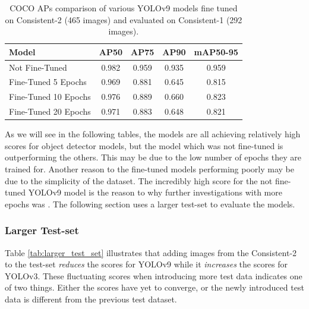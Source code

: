 \begin{table}[H]
    \centering
    \renewcommand{\arraystretch}{1.5} %
    \setlength{\tabcolsep}{1em}
    \begin{tabular}{|l|c|c|c|c|}
        \hline
        \rowcolor{gray!25}
        \textbf{Model} & \textbf{AP50} & \textbf{AP75} & \textbf{AP90} & \textbf{mAP50-95} \\ \hline
        Not Fine-Tuned       & 0.982 & 0.959 & 0.935 & 0.959 \\ \hline 
        Fine-Tuned 5 Epochs  & 0.969 & 0.881 & 0.645 & 0.815 \\ \hline
        Fine-Tuned 10 Epochs & 0.976 & 0.889 & 0.660 & 0.823 \\ \hline
        Fine-Tuned 20 Epochs & 0.971 & 0.883 & 0.648 & 0.821 \\ \hline
    \end{tabular}
    \caption{COCO APs comparison of various YOLOv9 models fine tuned on Consistent-2 (465 images) and evaluated on Consistent-1 (292 images).}
    \label{tab:APs_fine_tuning}
\end{table}

As we will see in the following tables, the models are all achieving relatively high scores for object detector models, but the model which was not fine-tuned is outperforming the others. This may be due to the low number of epochs they are trained for. Another reason to the fine-tuned models performing poorly may be due to the simplicity of the dataset. The incredibly high score for the not fine-tuned YOLOv9 model is the reason to why further investigations with more epochs was . The following section uses a larger test-set to evaluate the models.  

\subsubsection{Larger Test-set}
\label{sec:larger_test_set}
Table \ref{tab:larger_test_set} illustrates that adding images from the Consistent-2 to the test-set \textit{reduces} the scores for YOLOv9 while it \textit{increases} the scores for YOLOv3. These fluctuating scores when introducing more test data indicates one of two things. Either the scores have yet to converge, or the newly introduced test data is different from the previous test dataset. 

